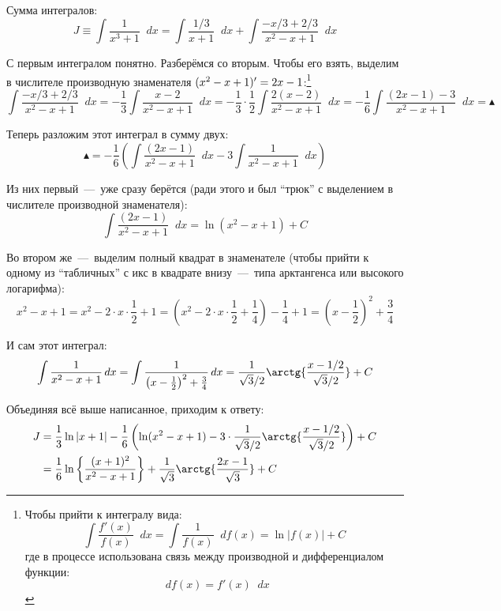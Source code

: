 \documentclass[a4paper,12pt]{article}
\newcommand{\diff}{\mathop{}\!d}
\begin{document}
\begin{solution}
    Сумма интегралов:
    \[
      J \equiv \int \frac{1}{x^3 + 1} \diff x
        = \int \frac{1/3}{x + 1} \diff x
        + \int \frac{-x/3 + 2/3}{x^2 - x + 1} \diff x
    \]

    С первым интегралом понятно.
    Разберёмся со вторым.
    Чтобы его взять, выделим в числителе производную знаменателя $(x^2 \hm- x \hm+ 1)' \hm= 2x \hm- 1$:\footnote{
      Чтобы прийти к интегралу вида:
      \[
        \int \frac{f'(x)}{f(x)} \diff x = \int \frac{1}{f(x)} \diff f(x) = \ln\bigl|f(x)\bigr| + C
      \]
      где в процессе использована связь между производной и дифференциалом функции:
      \[
        \diff f(x) = f'(x) \diff x
      \]
    }
    \[
      \int \frac{-x/3 + 2/3}{x^2 - x + 1} \diff x
      = -\frac{1}{3} \int \frac{x - 2}{x^2 - x + 1} \diff x
      = -\frac{1}{3} \cdot \frac{1}{2} \int \frac{2(x - 2)}{x^2 - x + 1} \diff x
      = -\frac{1}{6} \int \frac{(2x - 1) - 3}{x^2 - x + 1} \diff x = \blacktriangle
    \]

    Теперь разложим этот интеграл в сумму двух:
    \[
      \blacktriangle = -\frac{1}{6} \left(
        \int \frac{(2x - 1)}{x^2 - x + 1} \diff x - 3 \int \frac{1}{x^2 - x + 1} \diff x
      \right)
    \]

    Из них первый~---~уже сразу берётся (ради этого и был ``трюк'' с выделением в числителе производной знаменателя):
    \[
      \int \frac{(2x - 1)}{x^2 - x + 1} \diff x = \ln(x^2 - x + 1) + C
    \]

    Во втором же~---~выделим полный квадрат в знаменателе (чтобы прийти к одному из ``табличных'' с икс в квадрате внизу~---~типа арктангенса или высокого логарифма):
    \[
      x^2 - x + 1 = x^2 - 2 \cdot x \cdot \frac{1}{2} + 1 = \left(x^2 - 2 \cdot x \cdot \frac{1}{2} + \frac{1}{4}\right) - \frac{1}{4} + 1 = \left(x - \frac{1}{2}\right)^2 + \frac{3}{4}
    \]

    И сам этот интеграл:
    \[
      \int \frac{1}{x^2 - x + 1} \diff x
        = \int \frac{1}{\left(x - \frac{1}{2}\right)^2 + \frac{3}{4}} \diff x = \frac{1}{\sqrt{3}/2} \arctg{\frac{x - 1/2}{\sqrt{3}/2}} + C
    \]

    Объединяя всё выше написанное, приходим к ответу:
    \begin{equation*}
    \begin{split}
      J &= \frac{1}{3} \ln|x + 1| -\frac{1}{6} \left(\ln(x^2 - x + 1) - 3 \cdot \frac{1}{\sqrt{3}/2} \arctg{\frac{x - 1/2}{\sqrt{3}/2}} \right) + C\\
        &= \frac{1}{6} \ln \left\{\frac{(x + 1)^2}{x^2 - x + 1}\right\} + \frac{1}{\sqrt{3}} \arctg{\frac{2x - 1}{\sqrt{3}}} + C
    \end{split}
    \end{equation*}
  \end{solution}
\end{document}

